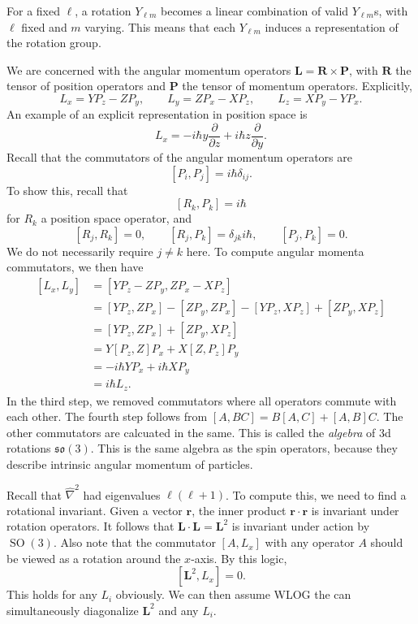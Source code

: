 For a fixed $\ell $, a rotation $Y_{\ell m} $ becomes a linear combination of valid $Y_{\ell m} $s, with $\ell $ fixed and $m$ varying. This means that each $Y_{\ell m} $ induces a representation of the rotation group.

We are concerned with the angular momentum operators $\mathbf{L} =\mathbf{R} \times \mathbf{P} $, with $\mathbf{R} $ the tensor of position operators and $\mathbf{P} $ the tensor of momentum operators. Explicitly,
\[
	L_x=YP_z-ZP_y,\qquad L_y=ZP_x-XP_z,\qquad L_z=XP_y-YP_x
.\]
An example of an explicit representation in position space is
\[
	L_x=-i\hbar y \frac{\partial }{\partial z} +i\hbar z \frac{\partial }{\partial y} 
.\]
Recall that the commutators of the angular momentum operators are
\[
	\left[ P_i,P_j \right] =i\hbar \delta_{ij} 
.\]
To show this, recall that
\[
	[R_k,P_k]=i\hbar 
\]
for $R_k$ a position space operator, and
\[
	\left[ R_j,R_k \right] =0,\qquad \left[ R_j,P_k \right] =\delta_{jk} i\hbar ,\qquad \left[ P_j,P_k \right] =0
.\]
We do not necessarily require $j\neq k$ here. To compute angular momenta commutators, we then have
\begin{align*}
	\left[ L_x,L_y \right] &=\left[ YP_z-ZP_y,ZP_x-XP_z \right] \\
			       &=\left[ YP_z,ZP_x \right] -\left[ ZP_y,ZP_x \right] -\left[ YP_z,XP_z \right] +\left[ ZP_y,XP_z \right] \\
			       &=\left[ YP_z,ZP_x \right] +\left[ ZP_y,XP_z \right] \\
			       &=Y\left[ P_z,Z \right] P_x+X\left[ Z,P_z \right] P_y\\
			       &=-i\hbar YP_x+i\hbar XP_y\\
			       &=i\hbar L_z
.\end{align*}
In the third step, we removed commutators where all operators commute with each other. The fourth step follows from $\left[ A,BC \right] =B\left[ A,C \right] +\left[ A,B \right] C$. The other commutators are calcuated in the same. This is called the \emph{algebra} of 3d rotations $\mathfrak{so} (3)$. This is the same algebra as the spin operators, because they describe intrinsic angular momentum of particles.

Recall that $\hat{\nabla }^2$ had eigenvalues $\ell (\ell +1)$. To compute this, we need to find a rotational invariant. Given a vector $\mathbf{r} $, the inner product $\mathbf{r} \cdot \mathbf{r} $ is invariant under rotation operators. It follows that $\mathbf{L} \cdot \mathbf{L} =\mathbf{L}^2$ is invariant under action by $\operatorname{SO} (3)$. Also note that the commutator $\left[ A,L_x \right] $ with any operator $A$ should be viewed as a rotation around the $x$-axis. By this logic,
\[
	\left[ \mathbf{L}^2 ,L_x \right] =0
.\]
This holds for any $L_i$ obviously. We can then assume WLOG the can simultaneously diagonalize $\mathbf{L} ^2$ and any $L_i$.


